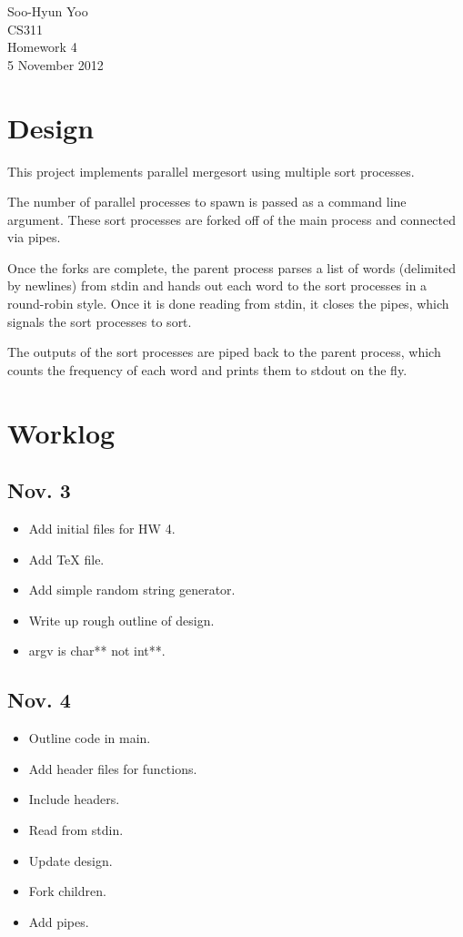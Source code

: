 \documentclass[12pt,letterpaper]{article}
\begin{document}
Soo-Hyun Yoo \\
CS311 \\
Homework 4 \\
5 November 2012


\section*{Design}

This project implements parallel mergesort using multiple sort processes.

The number of parallel processes to spawn is passed as a command line argument. These sort processes are forked off of the main process and connected via pipes.

Once the forks are complete, the parent process parses a list of words (delimited by newlines) from stdin and hands out each word to the sort processes in a round-robin style. Once it is done reading from stdin, it closes the pipes, which signals the sort processes to sort.

The outputs of the sort processes are piped back to the parent process, which counts the frequency of each word and prints them to stdout on the fly.


\section*{Worklog}

\subsection*{Nov. 3}

\begin{itemize}
	\item Add initial files for HW 4.
	\item Add TeX file.
	\item Add simple random string generator.
	\item Write up rough outline of design.
	\item argv is char** not int**.
\end{itemize}

\subsection*{Nov. 4}

\begin{itemize}
	\item Outline code in main.
	\item Add header files for functions.
	\item Include headers.
	\item Read from stdin.
	\item Update design.
	\item Fork children.
	\item Add pipes.
\end{itemize}
\end{document}
